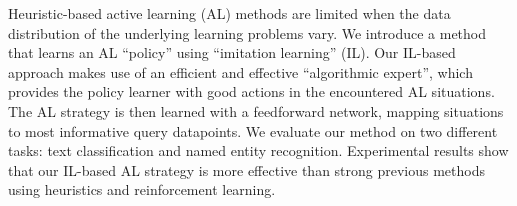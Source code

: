Heuristic-based active learning (AL) methods are limited when the data distribution of the underlying learning problems vary. We introduce a method that learns an AL ``policy'' using ``imitation learning'' (IL). Our IL-based approach makes use of an efficient and effective ``algorithmic expert'', which provides the policy learner with good actions in the encountered AL situations. The AL strategy is then learned with a feedforward network, mapping situations to most informative query datapoints. We evaluate our method on two different tasks: text classification and named entity recognition. Experimental results show that our IL-based AL strategy is more effective than strong previous methods using heuristics and reinforcement learning.

